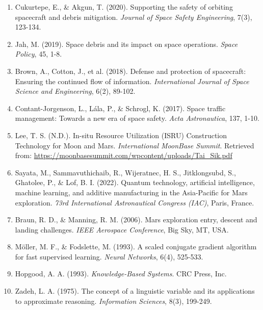 \documentclass[a4paper, 11pt]{article}
\begin{document}
\begin{enumerate}
    \item Cukurtepe, E., \& Akgun, T. (2020). Supporting the safety of orbiting spacecraft and debris mitigation. \textit{Journal of Space Safety Engineering}, 7(3), 123-134.
    
    \item Jah, M. (2019). Space debris and its impact on space operations. \textit{Space Policy}, 45, 1-8.
    
    \item Brown, A., Cotton, J., et al. (2018). Defense and protection of spacecraft: Ensuring the continued flow of information. \textit{International Journal of Space Science and Engineering}, 6(2), 89-102.
    
    \item Contant-Jorgenson, L., Lála, P., \& Schrogl, K. (2017). Space traffic management: Towards a new era of space safety. \textit{Acta Astronautica}, 137, 1-10.
    
    \item Lee, T. S. (N.D.). In-situ Resource Utilization (ISRU) Construction Technology for Moon and Mars. \textit{International MoonBase Summit}. Retrieved from: \url{https://moonbasesummit.com/wpcontent/uploads/Tai_Sik.pdf}
    
    \item Sayata, M., Sammavuthichaib, R., Wijeratnec, H. S., Jitklongsubd, S., Ghatolee, P., \& Lof, B. I. (2022). Quantum technology, artificial intelligence, machine learning, and additive manufacturing in the Asia-Pacific for Mars exploration. \textit{73rd International Astronautical Congress (IAC)}, Paris, France.
    
    \item Braun, R. D., \& Manning, R. M. (2006). Mars exploration entry, descent and landing challenges. \textit{IEEE Aerospace Conference}, Big Sky, MT, USA.
    
    \item Möller, M. F., \& Fodslette, M. (1993). A scaled conjugate gradient algorithm for fast supervised learning. \textit{Neural Networks}, 6(4), 525-533.
    
    \item Hopgood, A. A. (1993). \textit{Knowledge-Based Systems}. CRC Press, Inc.
    
    \item Zadeh, L. A. (1975). The concept of a linguistic variable and its applications to approximate reasoning. \textit{Information Sciences}, 8(3), 199-249.
    

\end{enumerate}
\end{document}
